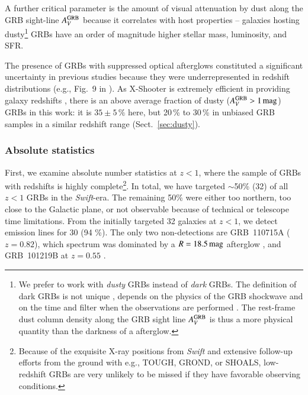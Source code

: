 \documentclass[traditabstract, longauth]{aa}
\begin{document}
A further critical parameter is the amount of visual attenuation by dust along the GRB sight-line $A^{\rm{GRB}}_V$ \citep{2011A&A...534A.108K, 2012ApJ...756..187H, 2013ApJ...778..128P, 2015ApJ...801..102P} because it correlates with host properties -- galaxies hosting dusty\footnote{We prefer to work with \textit{dusty} GRBs instead of \textit{dark} GRBs. The definition of dark GRBs is not unique \citep{2004ApJ...617L..21J, 2009ApJ...699.1087V}, depends on the physics of the GRB shockwave and on the time and filter when the observations are performed \citep{2011A&A...526A..30G}. The rest-frame dust column density along the GRB sight line  $A^{\rm{GRB}}_V$ is thus a more physical quantity than the darkness of a afterglow.} GRBs have an order of magnitude higher stellar mass, luminosity, and SFR. 

The presence of GRBs with suppressed optical afterglows \citep[e.g.,][]{1998ApJ...493L..27G, 2006ApJ...647..471L} constituted a significant uncertainty in previous studies because they were underrepresented in redshift distributions (e.g., Fig.~9 in \citealp{2012ApJ...756..187H}). As X-Shooter is extremely efficient in providing galaxy redshifts \citep{2012ApJ...758...46K}, there is an above average fraction of dusty ($A^{\rm{GRB}}_V>1\,\rm{mag}$) GRBs in this work: it is $35\pm5\,\%$  here, but 20\,\% to 30\,\% in unbiased GRB samples \citep{2011A&A...526A..30G, 2012MNRAS.421.1265M, 2014arXiv1412.6530L} in a similar redshift range (Sect.~\ref{sec:dusty}).

\subsubsection{Absolute statistics}
\label{sec:absstat}

{First, we examine absolute number statistics at $z<1$, where the sample of GRBs with redshifts is highly complete\footnote{Because of the exquisite X-ray positions from \textit{Swift} and extensive follow-up efforts from the ground with e.g., TOUGH, GROND, or SHOALS, low-redshift GRBs are very unlikely to be missed if they have favorable observing conditions.}. In total, we have targeted $\sim$50\% (32) of all $z<1$ GRBs in the \textit{Swift}-era. The remaining 50\% were either too northern, too close to the Galactic plane, or not observable because of technical or telescope time limitations. From the initially targeted 32 galaxies at $z<1$, we detect emission lines for 30 (94 \%). The only two non-detections are GRB~110715A ($z=0.82$), which spectrum was dominated by a $R=18.5\,\rm{mag}$ afterglow \citep{2011GCN..12164...1P}, and GRB~101219B at $z=0.55$ \citep{2011ApJ...735L..24S}.}
\end{document}
